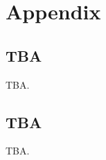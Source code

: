 


\chapter{Appendix}

\renewcommand{\thesection}{\Alph{section}}


\section{TBA}

TBA.


\section{TBA}

TBA.